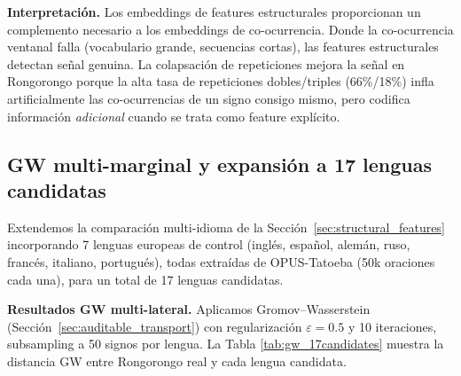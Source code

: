 \documentclass[11pt,a4paper]{article}
\newcommand{\1}{\mathbf{1}}
\numberwithin{equation}{section}
\begin{document}
\textbf{Interpretación.} Los embeddings de features estructurales proporcionan un complemento necesario a los embeddings de co-ocurrencia. Donde la co-ocurrencia ventanal falla (vocabulario grande, secuencias cortas), las features estructurales detectan señal genuina. La colapsación de repeticiones mejora la señal en Rongorongo porque la alta tasa de repeticiones dobles/triples (66\%/18\%) infla artificialmente las co-ocurrencias de un signo consigo mismo, pero codifica información \emph{adicional} cuando se trata como feature explícito.

\subsection{GW multi-marginal y expansión a 17 lenguas candidatas}
\label{sec:multi_gw_17}

Extendemos la comparación multi-idioma de la Sección~\ref{sec:structural_features} incorporando 7 lenguas europeas de control (inglés, español, alemán, ruso, francés, italiano, portugués), todas extraídas de OPUS-Tatoeba (50k oraciones cada una), para un total de 17 lenguas candidatas.

\textbf{Resultados GW multi-lateral.} Aplicamos Gromov--Wasserstein (Sección~\ref{sec:auditable_transport}) con regularización $\varepsilon=0.5$ y 10 iteraciones, subsampling a 50 signos por lengua. La Tabla \ref{tab:gw_17candidates} muestra la distancia GW entre Rongorongo real y cada lengua candidata.
\end{document}
